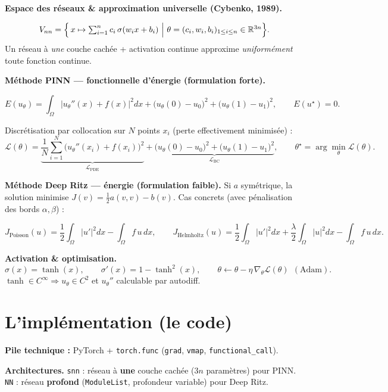 \documentclass[11pt]{article}
\newcommand{\key}[1]{\textbf{#1}}
\begin{document}
\textbf{Espace des réseaux \& approximation universelle (Cybenko, 1989).}
\begin{formbox}
\[
  V_{nn}=\Bigl\{\,x\mapsto \textstyle\sum_{i=1}^{n} c_i\,\sigma(w_i x+b_i)\ \Big|\
  \theta=(c_i,w_i,b_i)_{1\le i\le n}\in\mathbb{R}^{3n}\Bigr\}.
\]
Un réseau à \emph{une} couche cachée + activation continue approxime
\emph{uniformément} toute fonction continue.
\end{formbox}

\textbf{Méthode PINN — fonctionnelle d'énergie (formulation forte).}
\begin{formbox}
\[
  E(u_\theta)=\int_{\Omega}\bigl|u_\theta''(x)+f(x)\bigr|^2dx
   +\bigl(u_\theta(0)-u_0\bigr)^2+\bigl(u_\theta(1)-u_1\bigr)^2,
  \qquad E(u^\star)=0 .
\]
\end{formbox}
Discrétisation par collocation sur $N$ points $x_i$ (perte effectivement minimisée) :
\[
  \mathcal{L}(\theta)=
  \underbrace{\frac1N\sum_{i=1}^{N}\bigl(u_\theta''(x_i)+f(x_i)\bigr)^2}_{\mathcal{L}_{\mathrm{PDE}}}
  +\underbrace{\bigl(u_\theta(0)-u_0\bigr)^2+\bigl(u_\theta(1)-u_1\bigr)^2}_{\mathcal{L}_{\mathrm{BC}}},
  \qquad \theta^\star=\arg\min_\theta \mathcal{L}(\theta).
\]

\textbf{Méthode Deep Ritz — énergie (formulation faible).} Si $a$ symétrique,
la solution minimise $J(v)=\tfrac12 a(v,v)-b(v)$. Cas concrets (avec pénalisation
des bords $\alpha,\beta$) :
\begin{formbox}
\[
  J_{\text{Poisson}}(u)=\frac12\!\int_\Omega |u'|^2dx-\!\int_\Omega f\,u\,dx,
  \qquad
  J_{\text{Helmholtz}}(u)=\frac12\!\int_\Omega |u'|^2dx+\frac{\lambda}{2}\!\int_\Omega |u|^2dx-\!\int_\Omega f\,u\,dx .
\]
\end{formbox}

\textbf{Activation \& optimisation.}
\[
  \sigma(x)=\tanh(x),\qquad \sigma'(x)=1-\tanh^2(x),\qquad
  \theta \leftarrow \theta-\eta\,\nabla_\theta\mathcal{L}(\theta)\ \ (\text{Adam}).
\]
$\tanh\in C^\infty\Rightarrow u_\theta\in C^2$ et $u_\theta''$ calculable par autodiff.

\section{L'implémentation (le code)}
\textbf{Pile technique :} PyTorch + \texttt{torch.func} (\texttt{grad}, \texttt{vmap},
\texttt{functional\_call}).

\textbf{Architectures.} \texttt{snn} : réseau à \key{une} couche cachée
($3n$ paramètres) pour PINN. \texttt{NN} : réseau \key{profond}
(\texttt{ModuleList}, profondeur variable) pour Deep Ritz.
\end{document}
